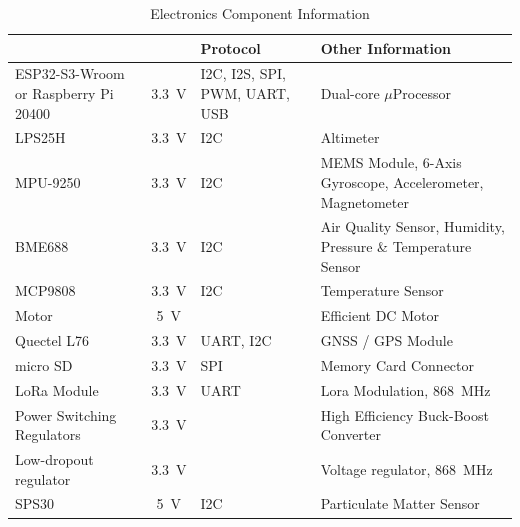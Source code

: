 \begin{table}[htbp]
\centering
{}
\begin{tabularx}{0.95\textwidth}{>{\raggedright\arraybackslash}p{3.5cm}c>{\raggedright\arraybackslash}X>{\raggedright\arraybackslash}p{5.5cm}}
\hline
\rowcolor{CDOSRPrimary}
\textbf{\color{white!50}{Component}} & \textbf{\color{white!50}{Voltage}} & \textbf{\color{white!50}\textbf{Protocol}} & \textbf{\color{white!50}\textbf{Other Information}} \\ \hline
\rowcolors{2}{red}{}
ESP32-S3-Wroom or Raspberry Pi 20400& \SI{3.3}{\volt} & I2C, I2S, SPI, PWM, UART, USB & {Dual-core $\mu$Processor}\\ %
\rowcolor{CDOSRSecondary!50}LPS25H & \SI{3.3}{\volt} & I2C & Altimeter\\ %
MPU-9250 & \SI{3.3}{\volt} & I2C & MEMS Module, 6-Axis Gyroscope,\/ Accelerometer,\/ Magnetometer\\ %
\rowcolor{CDOSRSecondary!50}BME688 & \SI{3.3}{\volt} & I2C & Air Quality Sensor, Humidity, Pressure \& Temperature Sensor\\ %
MCP9808 & \SI{3.3}{\volt} & I2C & Temperature Sensor\\ %
\rowcolor{CDOSRSecondary!50}Motor & \SI{5}{\volt} &  & Efficient DC Motor\\ %
Quectel L76 & \SI{3.3}{\volt} & UART, I2C & GNSS / GPS Module\\ %
\rowcolor{CDOSRSecondary!50}micro SD & \SI{3.3}{\volt} & SPI & Memory Card Connector\\ %
LoRa Module& \SI{3.3}{\volt} & UART & Lora Modulation, \SI{868}{\mega\hertz} \\ %
\rowcolor{CDOSRSecondary!50}Power Switching Regulators & \SI{3.3}{\volt} & & High Efficiency Buck-Boost Converter  \\ %
Low-dropout regulator& \SI{3.3}{\volt} & & Voltage regulator, \SI{868}{\mega\hertz} \\ %
\rowcolor{CDOSRSecondary!50}SPS30 & \SI{5}{\volt} & I2C & Particulate Matter Sensor  \\ %
\end{tabularx}
\caption{\small{Electronics Component Information}}
\end{table}

